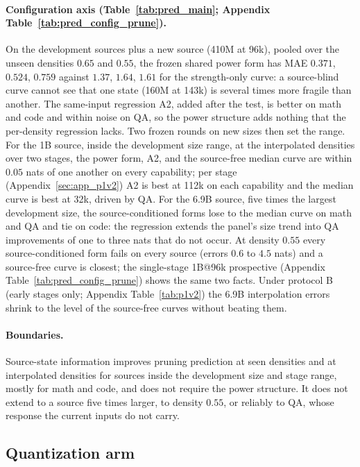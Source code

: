 \paragraph{Configuration axis (Table~\ref{tab:pred_main}; Appendix Table~\ref{tab:pred_config_prune}).}
On the development sources plus a new source (410M at 96k), pooled over
the unseen densities $0.65$ and $0.55$, the frozen shared power form
has MAE $0.371$, $0.524$, $0.759$ against $1.37$, $1.64$, $1.61$ for
the strength-only curve: a source-blind curve cannot see that one
state (160M at 143k) is several times more fragile than another. The
same-input regression A2, added after the test, is better on math and
code and within noise on QA, so the power structure adds nothing that
the per-density regression lacks. Two frozen rounds on new sizes then
set the range. For the 1B source, inside the development size range, at
the interpolated densities over two stages, the power form, A2, and the
source-free median curve are within $0.05$ nats of one another on every
capability; per stage (Appendix~\ref{sec:app_p1v2}) A2 is best at 112k
on each capability and the median curve is best at 32k, driven by QA.
For the 6.9B source, five times the largest development size, the
source-conditioned forms lose to the median curve on math and QA and
tie on code: the regression extends the panel's size trend into QA
improvements of one to three nats that do not occur. At density $0.55$
every source-conditioned form fails on every source (errors $0.6$ to
$4.5$ nats) and a source-free curve is closest; the single-stage 1B@96k
prospective (Appendix Table~\ref{tab:pred_config_prune}) shows the same
two facts. Under protocol B (early stages only; Appendix
Table~\ref{tab:p1v2}) the 6.9B interpolation errors shrink to the level
of the source-free curves without beating them.

\paragraph{Boundaries.} Source-state information improves pruning
prediction at seen densities and at interpolated densities for sources
inside the development size and stage range, mostly for math and code,
and does not require the power structure. It does not extend to a
source five times larger, to density $0.55$, or reliably to QA, whose
response the current inputs do not carry.

\subsection{Quantization arm}
\label{sec:quant}

